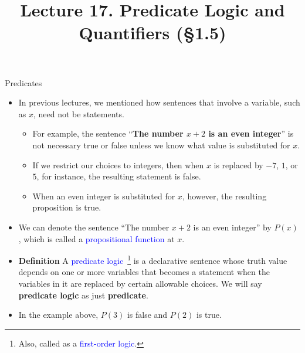 \documentclass[aspectratio=169]{beamer}
\title{Lecture 17. Predicate Logic and Quantifiers (\S 1.5)}
\date{ }
\providecommand{\Blue}[1]{\textcolor{blue}{#1}}
\begin{document}
\frame[plain]{\titlepage}

\begin{frame}[plain]{Predicates}
  
  \begin{itemize}
   \item  In previous lectures, we mentioned how sentences that involve a variable, such as $x$, need not be 
     statements.
     \begin{itemize}
      \item  For example, the sentence 
         ``{\bf The number $x+2$ is an even integer}'' is not necessary true or false
          unless we know what value is substituted for $x$.
      \item If we restrict our choices to integers, then when $x$ is replaced by
         $-7$, $1$, or $5$, for instance, the resulting statement is false. 
      \item When an even integer is substituted for $x$, however, the resulting proposition
         is true.
     \end{itemize}
     \pause 
    \item We can denote the sentence ``The number $x+2$ is an even integer'' by $P(x)$, 
    which is called a \Blue{propositional function} at $x$.
    \pause 
    \item {\bf Definition} A \Blue{predicate logic}~\footnote{Also, called as
    a \Blue{first-order logic}.} 
     is a declarative sentence whose truth value
       depends on one or more variables
    that becomes a statement
        when the variables in it  are replaced by 
           certain allowable choices.
           We will say {\bf predicate logic} as just {\bf predicate}.
           
     \item In the example above, $P(3)$ is false and $P(2)$ is true.
      
     \end{itemize}
 
     
\end{frame}


       
\end{document}
